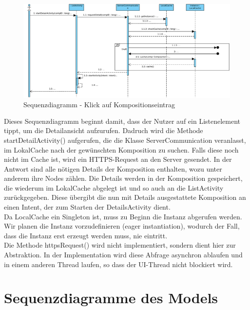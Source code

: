 \begin{figure}[h]
	\centering
	\includegraphics[width=\textwidth]{img/Diagramme/Sequenz/App_detail}
	\caption{Sequenzdiagramm - Klick auf Kompositionseintrag}
	\label{fig:sequenz-App_detail}
\end{figure}
\noindent
Dieses Sequenzdiagramm beginnt damit, dass der Nutzer auf ein Listenelement tippt, um die Detailansicht aufzurufen. 
Dadruch wird die Methode startDetailActivity() aufgerufen, die die Klasse ServerCommunication veranlasst, im LokalCache nach der gewünschten Komposition zu suchen.
Falls diese noch nicht im Cache ist, wird ein HTTPS-Request an den Server gesendet.
In der Antwort sind alle nötigen Details der Komposition enthalten, wozu unter anderem ihre Nodes zählen.
Die Details werden in der Komposition gespeichert, die wiederum im LokalCache abgelegt ist und so auch an die ListActivity zurückgegeben. Diese übergibt die nun mit Details ausgestattete Komposition an einen Intent, der zum Starten der DetailsActivity dient.
\\
Da LocalCache ein Singleton ist, muss zu Beginn die Instanz abgerufen werden. Wir planen die Instanz vorzudefinieren (eager instantiation), wodurch der Fall, dass die Instanz erst erzeugt werden muss, nie eintritt.
\\
Die Methode httpsRequest() wird nicht implementiert, sondern dient hier zur Abstraktion. In der Implementation wird diese Abfrage asynchron ablaufen und in einem anderen Thread laufen, so dass der UI-Thread nicht blockiert wird. 

\section*{Sequenzdiagramme des Models}

